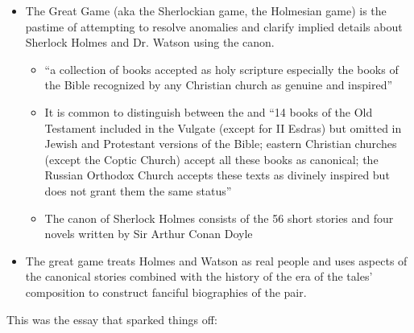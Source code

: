\documentclass[a4paper,landscape,headrule,footrule,xetex]{foils}
\begin{document}
\begin{itemize}
\item The Great Game (aka the Sherlockian game, the Holmesian game) is
  the pastime of attempting to resolve anomalies and clarify implied
  details about Sherlock Holmes and Dr. Watson using the canon.
\begin{itemize}
\item {} ``a collection of books accepted as holy scripture
  especially the books of the Bible recognized by any Christian church
  as genuine and inspired''
\item It is common to distinguish between the  and  ``14 books of the Old Testament included in the Vulgate (except for II Esdras) but omitted in Jewish and Protestant versions of the Bible; eastern Christian churches (except the Coptic Church) accept all these books as canonical; the Russian Orthodox Church accepts these texts as divinely inspired but does not grant them the same status''
\item The canon of Sherlock Holmes consists of the 56 short stories
  and four novels written by Sir Arthur Conan Doyle
\end{itemize}
\item The great game treats Holmes and Watson as real people and uses
  aspects of the canonical stories combined with the history of the
  era of the tales' composition to construct fanciful biographies of
  the pair.
\end{itemize}


This was the essay that sparked things off:
\end{document}
